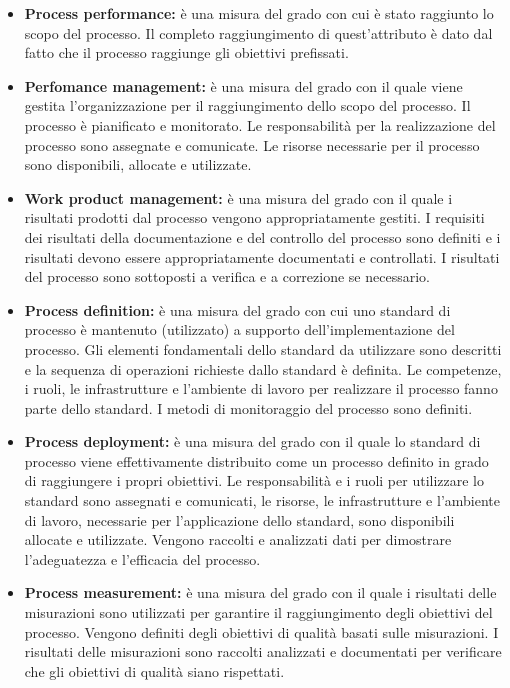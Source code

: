 	\begin{itemize}
	\item \textbf{Process performance:} è una misura del grado con cui è stato raggiunto lo scopo del processo. Il completo raggiungimento di quest'attributo è dato dal fatto che il processo raggiunge gli obiettivi prefissati.
	\item \textbf{Perfomance management:} è una misura del grado con il quale viene gestita l'organizzazione per il raggiungimento dello scopo del processo. Il processo è pianificato e monitorato. Le responsabilità per la realizzazione del processo sono assegnate e comunicate. Le risorse necessarie per il processo sono disponibili, allocate e utilizzate. 
	\item \textbf{Work product management:} è una misura del grado con il quale i risultati prodotti dal processo vengono appropriatamente gestiti. I requisiti dei risultati della documentazione e del controllo del processo sono definiti e i risultati devono essere appropriatamente documentati e controllati. I risultati del processo sono sottoposti a verifica e a correzione se necessario.
	\item \textbf{Process definition:} è una misura del grado con cui uno standard di processo è mantenuto (utilizzato) a supporto dell'implementazione del processo. Gli elementi fondamentali dello standard da utilizzare sono descritti e la sequenza di operazioni richieste dallo standard è definita. Le competenze, i ruoli, le infrastrutture e l'ambiente di lavoro per realizzare il processo fanno parte dello standard. I metodi di monitoraggio del processo sono definiti.
	\item \textbf{Process deployment:} è una misura del grado con il quale lo standard di processo viene effettivamente distribuito come un processo definito in grado di raggiungere i propri obiettivi. Le responsabilità e i ruoli per utilizzare lo standard sono assegnati e comunicati, le risorse, le infrastrutture e l'ambiente di lavoro, necessarie per l'applicazione dello standard, sono disponibili allocate e utilizzate. Vengono raccolti e analizzati dati per dimostrare l'adeguatezza e l'efficacia del processo.
	\item \textbf{Process measurement:} è una misura del grado con il quale i risultati delle misurazioni sono utilizzati per garantire il raggiungimento degli obiettivi del processo. Vengono definiti degli obiettivi di qualità basati sulle misurazioni. I risultati delle misurazioni sono raccolti analizzati e documentati per verificare che gli obiettivi di qualità siano rispettati.

\end{itemize}
